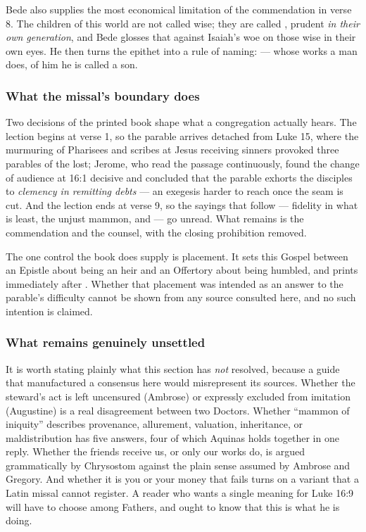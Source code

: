 Bede also supplies the most economical limitation of the commendation in verse
8. The children of this world are not called wise; they are called
, prudent \emph{in their own
generation}, and Bede glosses that against Isaiah's woe on those wise in their
own eyes. He then turns the epithet into a rule of naming:  --- whose works a man does, of
him he is called a son.

\subsubsection*{What the missal's boundary does}

Two decisions of the printed book shape what a congregation actually hears. The
lection begins at verse 1, so the parable arrives detached from Luke 15, where
the murmuring of Pharisees and scribes at Jesus receiving sinners provoked three
parables of the lost; Jerome, who read the passage continuously, found the
change of audience at 16:1 decisive and concluded that the parable exhorts the
disciples to \emph{clemency in remitting debts} --- an exegesis harder to reach
once the seam is cut. And the lection ends at verse 9, so the sayings that
follow --- fidelity in what is least, the unjust mammon, and  --- go unread. What remains is the
commendation and the counsel, with the closing prohibition removed.

The one control the book does supply is placement. It sets this Gospel between
an Epistle about being an heir and an Offertory about being humbled, and prints
 immediately after . Whether that
placement was intended as an answer to the parable's difficulty cannot be shown
from any source consulted here, and no such intention is claimed.

\subsubsection*{What remains genuinely unsettled}

It is worth stating plainly what this section has \emph{not} resolved, because a
guide that manufactured a consensus here would misrepresent its sources.
Whether the steward's act is left uncensured (Ambrose) or expressly excluded
from imitation (Augustine) is a real disagreement between two Doctors. Whether
``mammon of iniquity'' describes provenance, allurement, valuation,
inheritance, or maldistribution has five answers, four of which Aquinas holds
together in one reply. Whether the friends receive us, or only our works do, is
argued grammatically by Chrysostom against the plain sense assumed by Ambrose
and Gregory. And whether it is you or your money that fails turns on a variant
that a Latin missal cannot register. A reader who wants a single meaning for
Luke 16:9 will have to choose among Fathers, and ought to know that this is
what he is doing.

